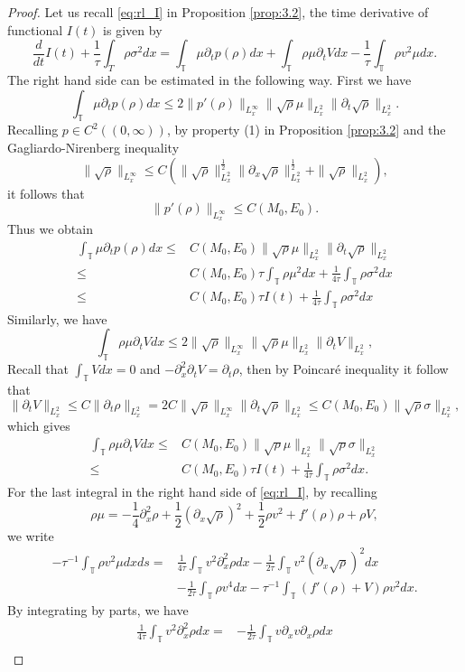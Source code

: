 \documentclass[leqno]{amsart}
\theoremstyle{plain}
\theoremstyle{definition}
\theoremstyle{remark}
\theoremstyle{plain}
\theoremstyle{plain}
\def\T{{\mathbb T}}%
\def\d{{\partial}}
\numberwithin{equation}{section}
\begin{document}
\begin{proof}
Let us recall \eqref{eq:rl_I} in Proposition \ref{prop:3.2}, the time derivative of functional $I(t)$ is given by
\[
\frac{d}{dt} I(t)+\frac{1}{\tau}\int_T\rho \sigma^2 dx=\int_\T \mu\d_tp(\rho)dx+\int_\T\rho\mu\d_tV dx-\frac{1}{\tau}\int_\T\rho v^2\mu dx.
\]
The right hand side can be estimated in the following way. First we have
\[
\int_\T \mu\d_tp(\rho)dx\leq 2\|p'(\rho)\|_{L^\infty_x}\|\sqrt\rho\mu\|_{L^2_x}\|\d_t\sqrt\rho\|_{L^2_x}.
\]
Recalling $p\in C^2((0,\infty))$, by property (1) in Proposition \ref{prop:3.2} and the Gagliardo-Nirenberg inequality
\[
\|\sqrt\rho\|_{L^\infty_x}\leq C(\|\sqrt\rho\|_{L^2_x}^\frac12\|\d_x\sqrt\rho\|_{L^2_x}^\frac12+\|\sqrt\rho\|_{L^2_x}),
\]
it follows that
\[
\|p'(\rho)\|_{L^\infty_x}\leq C(M_0,E_0).
\]
Thus we obtain
\begin{align*}
\int_\T \mu\d_tp(\rho)dx\leq & C(M_0,E_0)\|\sqrt\rho\mu\|_{L^2_x}\|\d_t\sqrt\rho\|_{L^2_x}\\
\leq & C(M_0,E_0)\tau\int_\T\rho\mu^2dx+\frac{1}{4\tau}\int_\T\rho\sigma^2dx\\
\leq & C(M_0,E_0)\tau I(t)+\frac{1}{4\tau}\int_\T\rho\sigma^2dx
\end{align*}
Similarly, we have
\[
\int_\T \rho\mu\d_tVdx\leq 2\|\sqrt\rho\|_{L^\infty_x}\|\sqrt\rho\mu\|_{L^2_x}\|\d_tV\|_{L^2_x},
\]
Recall that $\int_\T V dx=0$ and $-\d_x^2\d_tV=\d_t\rho$, then by Poincar\'e inequality it follow that
\[
\|\d_tV\|_{L^2_x}\leq C\|\d_t\rho\|_{L^2_x}=2C\|\sqrt\rho\|_{L^\infty_x}\|\d_t\sqrt\rho\|_{L^2_x}\leq C(M_0,E_0)\|\sqrt\rho\sigma\|_{L^2_x},
\]
which gives
\begin{align*}
\int_\T \rho\mu\d_tVdx\leq & C(M_0,E_0)\|\sqrt\rho\mu\|_{L^2_x}\|\sqrt\rho\sigma\|_{L^2_x}\\
\leq & C(M_0,E_0)\tau I(t)+\frac{1}{4\tau}\int_\T\rho\sigma^2dx.
\end{align*}
For the last integral in the right hand side of \eqref{eq:rl_I}, by recalling
\[
\rho\mu=-\frac14\d_x^2\rho+\frac12(\d_x\sqrt\rho)^2+\frac12\rho v^2+f'(\rho)\rho+\rho V,
\]
we write 
\begin{align*}
-\tau^{-1}\int_\T\rho v^2\mu dxds=&\frac{1}{4\tau}\int_\T v^2\d_x^2\rho dx-\frac{1}{2\tau}\int_\T v^2(\d_x\sqrt\rho)^2dx\\
&-\frac{1}{2\tau}\int_\T \rho v^4 dx-\tau^{-1}\int_\T (f'(\rho)+V)\rho v^2dx.
\end{align*}
By integrating by parts, we have
\begin{align*}
\frac{1}{4\tau}\int_\T v^2\d_x^2\rho dx=&-\frac{1}{2\tau}\int_\T v \d_x v\d_x\rho dx\\

\end{align*}
\end{proof}
\end{document}
